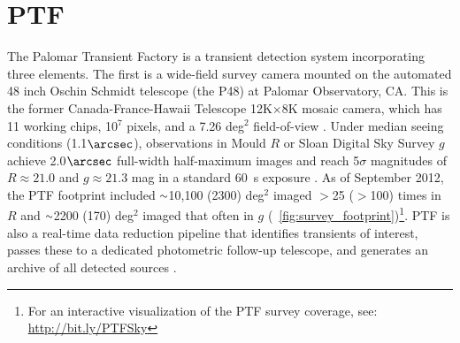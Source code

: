 \documentclass[12pt,preprint]{aastex}
\newcommand{\apwsim}{\raisebox{0.2ex}{\scriptsize$\sim$\normalsize}}
\begin{document}

\section{PTF } %
The Palomar Transient Factory is a transient detection system incorporating three elements. The first is a wide-field survey camera mounted on the automated 48 inch Oschin Schmidt telescope (the P48) at Palomar Observatory, CA. This is the former Canada-France-Hawaii Telescope 12K$\times$8K mosaic camera, which has 11 working chips, 10$^7$ pixels, and a 7.26 deg$^2$ field-of-view \citep{rahmer2008}. Under median seeing conditions (1.1$\arcsec$), observations in Mould $R$ or Sloan Digital Sky Survey \citep[SDSS;][]{york00} $g$ achieve 2.0$\arcsec$ full-width half-maximum images and reach 5$\sigma$ magnitudes of $R \approx 21.0$ and $g \approx 21.3$ mag in a standard 60~s exposure \citep{nick2010}. As of September 2012, the PTF footprint included $\apwsim$10,100 (2300) deg$^2$ imaged $>$25 ($>$100) times in $R$ and $\apwsim$2200 (170) deg$^2$ imaged that often in $g$ (\figurename~\ref{fig:survey_footprint})\footnote{For an interactive visualization of the PTF survey coverage, see: \url{http://bit.ly/PTFSky}}. PTF is also a real-time data reduction pipeline that identifies transients of interest, passes these to a dedicated photometric follow-up telescope, and generates an archive of all detected sources \citep{nick2009,rau2009}. %
\end{document}
